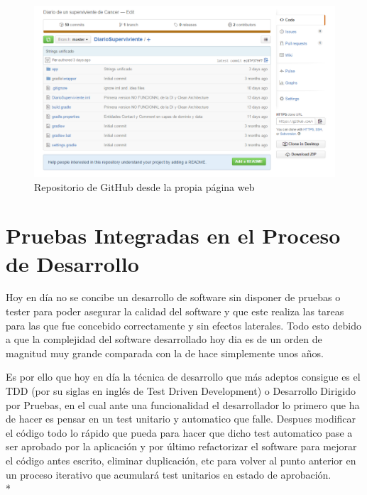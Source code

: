 \documentclass[../pfc.tex]{subfiles}
\begin{document}
	\begin{figure}[H]
		\centering
		\includegraphics[width=1\linewidth]{../images/githubDiarioSuperviviente}
		\caption{Repositorio de GitHub desde la propia página web }
		\label{fig:ghweb}
	\end{figure}

	\clearpage
	
	\section{Pruebas Integradas en el Proceso de Desarrollo}
	
	Hoy en día no se concibe un desarrollo de software sin disponer de pruebas o tester para poder asegurar la calidad del software y que este realiza las tareas para las que fue concebido correctamente y sin efectos laterales. Todo esto debido a que la complejidad del software desarrollado hoy dia es de un orden de magnitud muy grande comparada con la de hace simplemente unos años.
	
	Es por ello que hoy en día la técnica de desarrollo que más adeptos consigue es el TDD (por su siglas en inglés de Test Driven Development) o Desarrollo Dirigido por Pruebas, en el cual ante una funcionalidad el desarrollador lo primero que ha de hacer es pensar en un test unitario y automatico que falle. Despues modificar el código todo lo rápido que pueda para hacer que dicho test automatico pase a ser aprobado por la aplicación y por último refactorizar el software para mejorar el código antes escrito, eliminar duplicación, etc para volver al punto anterior en un proceso iterativo que acumulará test unitarios en estado de aprobación.\\* 
	
\end{document}
